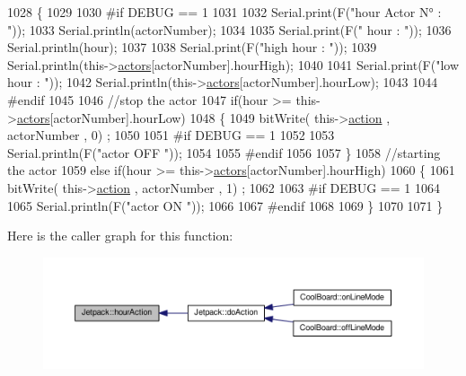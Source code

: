 \begin{DoxyCode}
1028 \{
1029 
1030 \textcolor{preprocessor}{#if DEBUG == 1}
1031     
1032     Serial.print(F(\textcolor{stringliteral}{"hour Actor N° : "}));
1033     Serial.println(actorNumber);
1034 
1035     Serial.print(F(\textcolor{stringliteral}{" hour : "}));
1036     Serial.println(hour);
1037 
1038     Serial.print(F(\textcolor{stringliteral}{"high hour : "}));
1039     Serial.println(this->\hyperlink{class_jetpack_a7e16d2f97837f9712a2e6de1c50d99db}{actors}[actorNumber].hourHigh);
1040 
1041     Serial.print(F(\textcolor{stringliteral}{"low hour : "}));
1042     Serial.println(this->\hyperlink{class_jetpack_a7e16d2f97837f9712a2e6de1c50d99db}{actors}[actorNumber].hourLow);
1043 
1044 \textcolor{preprocessor}{#endif}
1045 
1046     \textcolor{comment}{//stop the actor    }
1047     \textcolor{keywordflow}{if}(hour >= this->\hyperlink{class_jetpack_a7e16d2f97837f9712a2e6de1c50d99db}{actors}[actorNumber].hourLow)
1048     \{
1049         bitWrite( this->\hyperlink{class_jetpack_aca3142925a7b0834b34ae91d26af7765}{action} , actorNumber , 0) ;
1050 
1051 \textcolor{preprocessor}{    #if DEBUG == 1 }
1052 
1053         Serial.println(F(\textcolor{stringliteral}{"actor OFF "}));
1054 
1055 \textcolor{preprocessor}{    #endif  }
1056 
1057     \}
1058     \textcolor{comment}{//starting the actor}
1059     \textcolor{keywordflow}{else} \textcolor{keywordflow}{if}(hour >= this->\hyperlink{class_jetpack_a7e16d2f97837f9712a2e6de1c50d99db}{actors}[actorNumber].hourHigh)
1060     \{
1061         bitWrite( this->\hyperlink{class_jetpack_aca3142925a7b0834b34ae91d26af7765}{action} , actorNumber , 1) ;
1062 
1063 \textcolor{preprocessor}{    #if DEBUG == 1 }
1064 
1065         Serial.println(F(\textcolor{stringliteral}{"actor ON "}));
1066 
1067 \textcolor{preprocessor}{    #endif  }
1068     
1069     \}
1070 
1071 \}
\end{DoxyCode}
Here is the caller graph for this function\+:\nopagebreak
\begin{figure}[H]
\begin{center}
\leavevmode
\includegraphics[width=350pt]{df/d1d/class_jetpack_acd6889af2fe5b057c6bd51b6dac827ef_icgraph}
\end{center}
\end{figure}
\mbox{\label{class_jetpack_ae01c13c785ebdf1b0bb5500234aba1bd}} 
